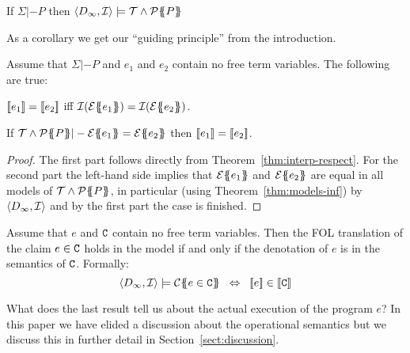 \begin{theorem}\label{thm:models-inf}
If $\Sigma |- P$ then $\langle D_{\infty},{\cal I}\rangle \models {\cal T} \land {\cal P}\{\!\!\{P\}\!\!\}$ 
\end{theorem} 
As a corollary we get our ``guiding principle'' from the introduction.
\begin{corollary}\label{cor:guiding-principle} 
Assume that $\Sigma |- P$ and $e_1$ and $e_2$ contain no free term variables. The following
are true:
\begin{itemize*}
  \item $[\![e_1]\!] = [\![e_2]\!]$ iff ${\cal I}(\etrans{}{}{e_1}) = {\cal I}(\etrans{}{}{e_2})$.
  \item If $\Th \land \ptrans{\Sigma}{P} |- \etrans{}{}{e_1} = \etrans{}{}{e_2}$ then $[\![e_1]\!] = [\![e_2]\!]$. 
\end{itemize*}
\end{corollary} 
\begin{proof} The first part follows directly from Theorem~\ref{thm:interp-respect}.
For the second part the left-hand side implies that ${\cal E}\{\!\!\{e_1\}\!\!\}$ and ${\cal E}\{\!\!\{e_2\}\!\!\}$ are 
equal in all models of ${\cal T} \land {\cal P}\{\!\!\{P\}\!\!\}$, in particular (using Theorem~\ref{thm:models-inf}) 
by $\langle D_{\infty},{\cal I}\rangle$ and by the first part the case is finished. 
\end{proof}


\begin{theorem}\label{thm:den-contr-satisfaction} Assume that $e$ and ${\tt C}$ contain no free 
term variables. Then the FOL translation of the claim $e \in {\tt C}$ holds in the model
if and only if the denotation of $e$ is in the semantics of ${\tt C}$.  Formally:
$$\langle D_\infty,{\cal I}\rangle \models \ctrans{}{\cdot}{e \in \Ct}
  \;\; \Leftrightarrow \;\; \dbrace{e} \in \dbrace{\Ct}
$$
\end{theorem} 

What does the last result tell us about the actual execution of the program $e$? In this
paper we have elided a discussion about the operational semantics but we discuss this
in further detail in Section~\ref{sect:discussion}.

